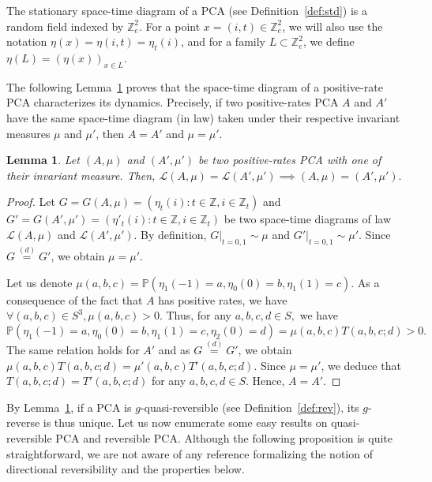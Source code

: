 \documentclass[10pt]{amsart}
\newtheorem{lemm}[theo]{Lemma}\newtheorem{prop}[theo]{Proposition}\newtheorem{coro}[theo]{Corollary}\newtheorem{conj}[theo]{Conjecture}
\theoremstyle{definition}\newtheorem{defi}[theo]{Definition}\newtheorem{rema}[theo]{Remark}\newtheorem{exam}[theo]{Example}\newtheorem{exem}[theo]{Example}\newtheorem{nota}[theo]{Notation}
\newcounter{a}
\newcommand{\eqd}{\stackrel{(d)}{=}}
\newcommand{\ZZ}{\mathbb{Z}}
\newcommand{\Z}{\mathbb{Z}}
\newcommand{\Pbb}{\mathbb{P}}
\renewcommand{\L}{\mathcal{L}}
\let\oldforall\forall
\renewcommand*{\forall}{\mathrel{\oldforall}}
\begin{document}
The stationary space-time diagram of a PCA (see Definition~\ref{def:std}) is a random field indexed by $\Z_{e}^2$. For a point $x=(i,t)\in\Z_{e}^2$, we will also use the notation $\eta(x)=\eta(i,t)=\eta_t(i)$, and for a family $L\subset\Z_{e}^2$, we define $\eta(L)=(\eta(x))_{x\in L}$.

The following Lemma~\ref{lem-std} proves that the space-time diagram of a positive-rate PCA characterizes its dynamics. Precisely, if two positive-rates PCA $A$ and $A'$ have the same space-time diagram (in law) taken under their respective invariant measures $\mu$ and $\mu'$, then $A=A'$ and $\mu=\mu'$.

\begin{lemm}\label{lem-std}
Let $(A,\mu)$ and $(A',\mu')$ be two positive-rates PCA with one of their invariant measure. Then, $\L(A,\mu) = \L(A',\mu') \implies (A,\mu) = (A',\mu').$
\end{lemm}

\begin{proof}
Let $G=G(A,\mu)=(\eta_t(i) : t \in \ZZ, i \in \ZZ_t)$ and $G'=G(A',\mu')=(\eta'_t(i) : t \in \ZZ, i \in \ZZ_t)$ be two space-time diagrams of law $\L(A,\mu)$ and $\L(A',\mu')$. By definition, $G|_{t=0,1} \sim \mu$ and $G'|_{t=0,1} \sim \mu'$. Since $G \eqd G'$, we obtain $\mu = \mu'$.

Let us denote $\mu(a,b,c)=\Pbb\left(\eta_1(-1) = a, \eta_0(0) = b, \eta_1(1) = c\right)$. As a consequence of the fact that $A$ has positive rates, we have $\forall (a,b,c) \in S^3, \mu(a,b,c)> 0$.
Thus, for any $a,b,c,d\in S,$ we have
\[
\Pbb\left(\eta_1(-1) = a, \eta_0(0) = b, \eta_1(1) = c, \eta_2(0) = d\right) = \mu(a,b,c) T(a,b,c;d) > 0.
\]
The same relation holds for $A'$ and as $G \eqd G'$, we obtain $\mu(a,b,c) T(a,b,c;d)= \mu'(a,b,c) T'(a,b,c;d).$ Since $\mu=\mu'$, we deduce that $T(a,b,c;d) = T'(a,b,c;d)$ for any $a,b,c,d\in S$. Hence, $A=A'$.
\end{proof}

By Lemma~\ref{lem-std}, if a PCA is $g$-quasi-reversible (see Definition~\ref{def:rev}), its $g$-reverse is thus unique. Let us now enumerate some easy results on quasi-reversible PCA and reversible PCA. Although the following proposition is quite straightforward, we are not aware of any reference formalizing the notion of directional reversibility and the properties below.
\end{document}
